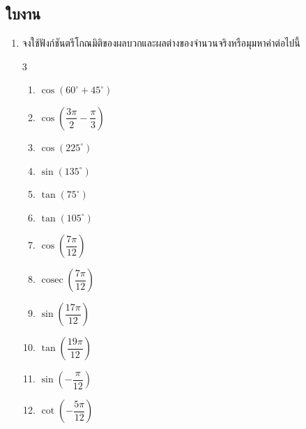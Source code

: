 \subsection*{ใบงาน}
\begin{enumerate}[label=\arabic*., leftmargin=*, itemsep=1em]
	\item จงใช้ฟังก์ชันตรีโกณมิติของผลบวกและผลต่างของจำนวนจริงหรือมุมหาค่าต่อไปนี้
	\begin{multicols}{3}
		\begin{enumerate}[label=\theenumi\arabic*), leftmargin=1.5em, itemsep=0.6em]
			\everymath{\displaystyle}
			\item $\cos \left( 60^{\circ} + 45^{\circ} \right)$
			\item $\cos \left( \dfrac{3\pi}{2} - \dfrac{\pi}{3} \right)$
			\item $\cos \left( 225^{\circ} \right)$
			\item $\sin \left( 135^{\circ} \right)$
			\item $\tan \left( 75^{\circ} \right)$
			\item $\tan \left( 105^{\circ} \right)$
			\item $\cos \left( \dfrac{7\pi}{12} \right)$
			\item $\operatorname{cosec} \left( \dfrac{7\pi}{12} \right)$
			\item $\sin \left( \dfrac{17\pi}{12} \right)$
			\item $\tan \left( \dfrac{19\pi}{12} \right)$
			\item $\sin \left( -\dfrac{\pi}{12} \right)$
			\item $\cot \left( -\dfrac{5\pi}{12} \right)$
		\end{enumerate}
	\end{multicols}
	

\end{enumerate}

